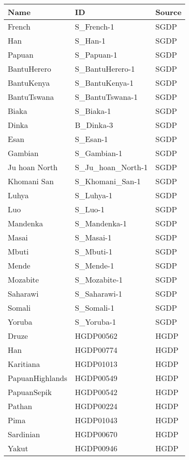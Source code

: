 \begin{table}[ht]
\centering
\begin{tabular}{lll}
  \hline
Name & ID & Source \\ 
  \hline
French & S\_French-1 & SGDP \\ 
  Han & S\_Han-1 & SGDP \\ 
  Papuan & S\_Papuan-1 & SGDP \\ 
  BantuHerero & S\_BantuHerero-1 & SGDP \\ 
  BantuKenya & S\_BantuKenya-1 & SGDP \\ 
  BantuTswana & S\_BantuTswana-1 & SGDP \\ 
  Biaka & S\_Biaka-1 & SGDP \\ 
  Dinka & B\_Dinka-3 & SGDP \\ 
  Esan & S\_Esan-1 & SGDP \\ 
  Gambian & S\_Gambian-1 & SGDP \\ 
  Ju hoan North & S\_Ju\_hoan\_North-1 & SGDP \\ 
  Khomani San & S\_Khomani\_San-1 & SGDP \\ 
  Luhya & S\_Luhya-1 & SGDP \\ 
  Luo & S\_Luo-1 & SGDP \\ 
  Mandenka & S\_Mandenka-1 & SGDP \\ 
  Masai & S\_Masai-1 & SGDP \\ 
  Mbuti & S\_Mbuti-1 & SGDP \\ 
  Mende & S\_Mende-1 & SGDP \\ 
  Mozabite & S\_Mozabite-1 & SGDP \\ 
  Saharawi & S\_Saharawi-1 & SGDP \\ 
  Somali & S\_Somali-1 & SGDP \\ 
  Yoruba & S\_Yoruba-1 & SGDP \\ 
  Druze & HGDP00562 & HGDP \\ 
  Han & HGDP00774 & HGDP \\ 
  Karitiana & HGDP01013 & HGDP \\ 
  PapuanHighlands & HGDP00549 & HGDP \\ 
  PapuanSepik & HGDP00542 & HGDP \\ 
  Pathan & HGDP00224 & HGDP \\ 
  Pima & HGDP01043 & HGDP \\ 
  Sardinian & HGDP00670 & HGDP \\ 
  Yakut & HGDP00946 & HGDP \\ 

\end{tabular}
\end{table}
